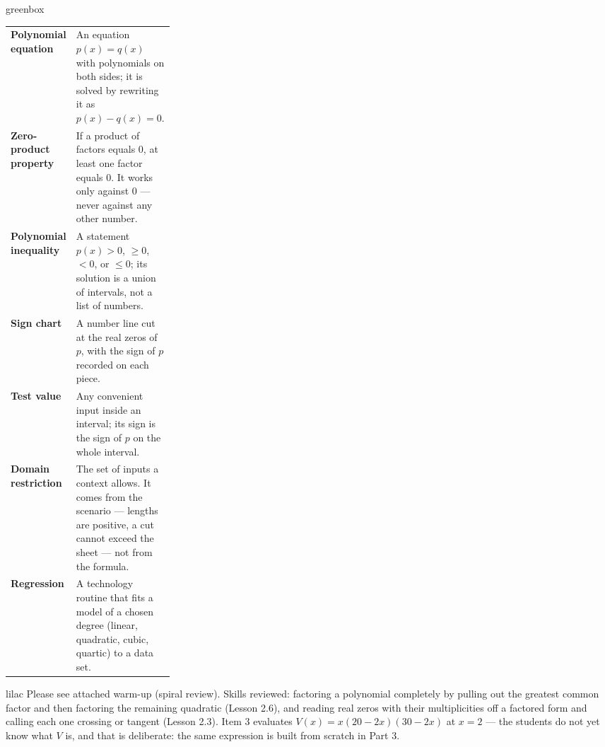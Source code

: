 \documentclass[10pt]{article}
\begin{document}
\begin{skillbox}{greenbox}
\renewcommand{\arraystretch}{1.4}
\begin{tabularx}{\linewidth}{@{} >{\leavevmode\bfseries\color{plum}}p{0.27\linewidth} X @{}}
Polynomial equation & An equation $p(x) = q(x)$ with polynomials on both sides; it is solved by rewriting it as $p(x) - q(x) = 0$. \\
Zero-product property & If a product of factors equals $0$, at least one factor equals $0$. It works only against $0$ --- never against any other number. \\
Polynomial inequality & A statement $p(x) > 0$, $\ge 0$, $< 0$, or $\le 0$; its solution is a union of intervals, not a list of numbers. \\
Sign chart & A number line cut at the real zeros of $p$, with the sign of $p$ recorded on each piece. \\
Test value & Any convenient input inside an interval; its sign is the sign of $p$ on the whole interval. \\
Domain restriction & The set of inputs a context allows. It comes from the scenario --- lengths are positive, a cut cannot exceed the sheet --- not from the formula. \\
Regression & A technology routine that fits a model of a chosen degree (linear, quadratic, cubic, quartic) to a data set. \\
\end{tabularx}
\end{skillbox}

\begin{skillbox}{lilac}
    Please see attached warm-up (spiral review).
    Skills reviewed: factoring a polynomial completely by pulling out the
    greatest common factor and then factoring the remaining quadratic
    (Lesson 2.6), and reading real zeros with their multiplicities off a
    factored form and calling each one crossing or tangent (Lesson 2.3). Item 3
    evaluates $V(x) = x(20-2x)(30-2x)$ at $x = 2$ --- the students do not yet
    know what $V$ is, and that is deliberate: the same expression is built from
    scratch in Part 3.
\end{skillbox}
\end{document}
